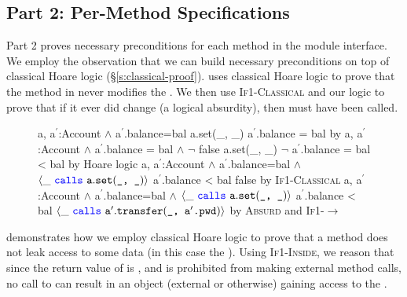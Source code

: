 \subsection{Part 2: Per-Method \Nec Specifications}
\label{s:BA-classical}
Part 2 proves necessary preconditions for each method in 
the module interface. We employ the observation that
we can build necessary preconditions on top of classical 
Hoare logic (\S \ref{s:classical-proof}).
\textbf{} uses classical Hoare logic
to prove that the  method in 
never modifies the . We then use \textsc{If1-Classical}
and our \Nec logic to prove that if it ever did change (a logical absurdity),
then  must have been called.
\begin{figure}[htb]
{
	\begin{proofexample}
			{\proofstepwithrule
				{\hoareEx
						{a, a$^\prime$:Account $\wedge$ a$^\prime$.balance=bal}
						{a.set(\_, \_)}
						{a$^\prime$.balance = bal}
						}
					{by \funcSpec}
			}
			{\proofstepwithrule
				{\hoareEx
						{a, a$^\prime$:Account $\wedge$ a$^\prime$.balance = bal $\wedge$ $\neg$ false}
						{a.set(\_, \_)}
						{$\neg$ a$^\prime$.balance = bal < bal}
						}
					{by Hoare logic}
			}
			{\proofstepwithrule
				{\onlyIfSingleExAlt
						{a, a$^\prime$:Account $\wedge$ a$^\prime$.balance=bal $\wedge$ $\langle \_\ {\color{blue}\texttt{calls}}\ {\texttt{a}}.{\texttt{set}}({\texttt{\_, \_}}) \rangle$}
						{a$^\prime$.balance < bal}
						{false}
						}
					{by \textsc{If1-Classical}}
			}
			{\proofstepwithrule
				{\onlyIfSingleExAlt
						{a, a$^\prime$:Account $\wedge$ a$^\prime$.balance=bal $\wedge$ $\langle \_\ {\color{blue}\texttt{calls}}\ {\texttt{a}}.{\texttt{set}}({\texttt{\_, \_}}) \rangle$}
						{a$^\prime$.balance < bal}
						{$\langle \_\ {\color{blue}\texttt{calls}}\ {\texttt{a}}^\prime.{\texttt{transfer}}({\texttt{\_, a$^\prime$.pwd}}) \rangle$}
						}
					{by \textsc{Absurd} and \textsc{If1-}$\longrightarrow$}
			}
		\endproofsteps
	\end{proofexample}
}
\end{figure}
\textbf{} demonstrates how we employ classical Hoare logic
to prove that a method does not leak access to some data (in this case the ).
Using \textsc{If1-Inside}, we reason that since the return value of  is
, and  is prohibited from making external method calls,
no call to  can result in an object (external or otherwise) gaining access to the .
